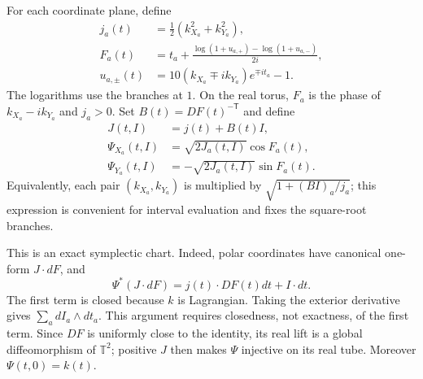 For each coordinate plane, define
\begin{equation}
 \begin{aligned}
 j_a(t)&=\tfrac12(k_{X_a}^2+k_{Y_a}^2),\\
 F_a(t)&=t_a+\frac{\log(1+u_{a,+})-\log(1+u_{a,-})}{2i},\\
 u_{a,\pm}(t)&=10(k_{X_a}\mp i k_{Y_a})e^{\mp it_a}-1.
 \end{aligned}
 \label{eq:measure-polar-chart-data}
\end{equation}
The logarithms use the branches at $1$. On the real torus, $F_a$ is
the phase of $k_{X_a}-ik_{Y_a}$ and $j_a>0$.
Set $B(t)=DF(t)^{-\mathsf T}$ and define
\begin{equation}
 \begin{aligned}
 J(t,I)&=j(t)+B(t)I,\\
 \Psi_{X_a}(t,I)&=\sqrt{2J_a(t,I)}\cos F_a(t),\\
 \Psi_{Y_a}(t,I)&=-\sqrt{2J_a(t,I)}\sin F_a(t).
 \end{aligned}
 \label{eq:measure-explicit-psi}
\end{equation}
Equivalently, each pair $(k_{X_a},k_{Y_a})$ is multiplied by
$\sqrt{1+(BI)_a/j_a}$; this expression is convenient for interval
evaluation and fixes the square-root branches.

This is an exact symplectic chart. Indeed, polar coordinates have
canonical one-form $J\cdot dF$, and
\[
 \Psi^*(J\cdot dF)=j(t)\cdot DF(t)dt+I\cdot dt.
\]
The first term is closed because $k$ is Lagrangian. Taking the exterior
derivative gives $\sum_a dI_a\wedge dt_a$. This argument requires
closedness, not exactness, of the first term. Since $DF$ is uniformly
close to the identity, its real lift is a global diffeomorphism of
$\mathbb T^2$; positive $J$ then makes $\Psi$ injective on its real
tube. Moreover $\Psi(t,0)=k(t)$.

